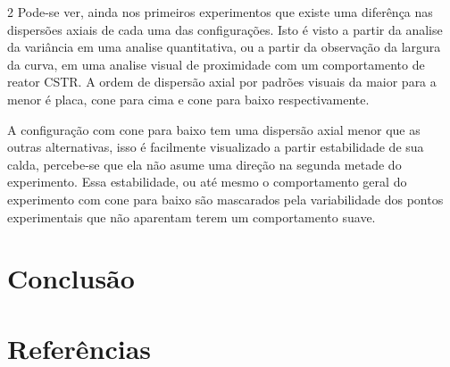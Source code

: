 \documentclass[a4paper,12pt,fleqn]{article}
\begin{document}
\begin{multicols}{2}
			Pode-se ver, ainda nos primeiros experimentos que existe uma diferênça nas dispersões axiais de cada uma das configurações. Isto é visto a partir da analise da variância em uma analise quantitativa, ou a partir da observação da largura da curva, em uma analise visual de proximidade com um comportamento de reator CSTR. A ordem de dispersão axial por padrões visuais da maior para a menor é placa, cone para cima e cone para baixo respectivamente.

			A configuração com cone para baixo tem uma dispersão axial menor que as outras alternativas, isso é facilmente visualizado a partir estabilidade de sua calda, percebe-se que ela não asume uma direção na segunda metade do experimento. Essa estabilidade, ou até mesmo o comportamento geral do experimento com cone para baixo são mascarados pela variabilidade dos pontos experimentais que não aparentam terem um comportamento suave.

		\section{Conclusão}

		\section*{Referências}
			\begingroup
			\renewcommand{\section}[2]{} 

			\makeatletter
			\renewcommand{\@biblabel}[1]{}

			\renewenvironment{thebibliography}[1]{%
				\list{}{%
					\setlength{\leftmargin}{0pt}  %
					\setlength{\itemindent}{0pt}  %
					\setlength{\labelwidth}{0pt}  %
					\setlength{\labelsep}{0pt}    %
					\setlength{\itemsep}{10pt}    %
					\setlength{\parsep}{0pt}
				}%
				\sloppy      %
				\justifying  %
			}{%
				\endlist
			}
			\makeatother

			\fontsize{10}{12}\selectfont

			
		\endgroup
	\end{multicols}
\end{document}
